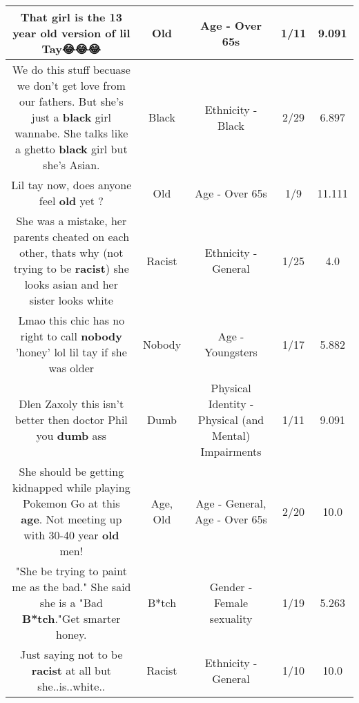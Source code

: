 \documentclass[11pt]{article}
\newlength\mylength
\begin{document}
\begin{center}
\begin{longtable}{|C{.65\mylength}|C{.30\mylength}|C{.12\mylength}|C{.12\mylength}|C{.12\mylength}|}
  \small That girl is the 13 year \textbf{old} version of lil Tay😂😂😂\normalsize   & Old & Age - Over 65s & 1/11 & 9.091 \\  \hline
  \small We do this stuff becuase we don't get love from our fathers. But she's just a \textbf{black} girl wannabe. She talks like a ghetto \textbf{black} girl but she's Asian.\normalsize   & Black & Ethnicity - Black & 2/29 & 6.897 \\  \hline
  \small Lil tay now, does anyone feel \textbf{old} yet ?\normalsize   & Old & Age - Over 65s & 1/9 & 11.111 \\  \hline
  \small She was a mistake, her parents cheated on each other, thats why (not trying to be \textbf{racist}) she looks asian and her sister looks white\normalsize   & Racist & Ethnicity - General & 1/25 & 4.0 \\  \hline
  \small Lmao this chic has no right to call \textbf{nobody} 'honey' lol lil tay if she was older\normalsize   & Nobody & Age - Youngsters & 1/17 & 5.882 \\  \hline
  \small Dlen Zaxoly this isn't better then doctor Phil you \textbf{dumb} ass\normalsize   & Dumb & Physical Identity - Physical (and Mental) Impairments & 1/11 & 9.091 \\  \hline
  \small She should be getting kidnapped while playing Pokemon Go at this \textbf{age}. Not meeting up with 30-40 year \textbf{old} men!\normalsize   & Age, Old & Age - General, Age - Over 65s & 2/20 & 10.0 \\  \hline
  \small "She be trying to paint me as the bad." She said she is a "Bad \textbf{B*tch}."Get smarter honey.\normalsize   & B*tch & Gender - Female sexuality & 1/19 & 5.263 \\  \hline
  \small Just saying not to be \textbf{racist} at all but she..is..white..\normalsize   & Racist & Ethnicity - General & 1/10 & 10.0 \\  \hline

\end{longtable}
\end{center}
\end{document}
